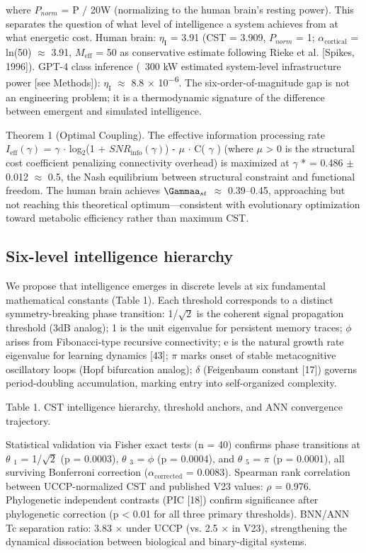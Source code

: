 \documentclass[a4paper,12pt]{article}
\providecommand{\textsubscript}[1]{\ensuremath{_{\text{#1}}}}
\begin{document}
where $P_{norm}$ = P / 20W (normalizing to the human brain's resting power).
This separates the question of what level of intelligence a system achieves from at what energetic cost.
Human brain: $\eta_{\text{I}}$ = 3.91 (CST = 3.909, $P_{norm}$ = 1; $\alpha_{\text{cortical}}$ = ln(50)  $\approx$  3.91, $M_{\text{eff}}$ = 50 as conservative estimate following Rieke et al. [Spikes, 1996]).
GPT-4 class inference (~300 kW estimated system-level infrastructure power [see Methods]): $\eta_{\text{I}}$  $\approx$  8.8 $\times$ 10\textsuperscript{$-$}\textsuperscript{6}.
The six-order-of-magnitude gap is not an engineering problem; it is a thermodynamic signature of the difference between emergent and simulated intelligence.

Theorem 1 (Optimal Coupling).
The effective information processing rate $I_{\text{eff}}(\gamma)$ =  $\gamma$   $\cdot$  log\textsubscript{2}(1 + $SNR_{\text{info}}(\gamma)$) -  $\mu$   $\cdot$  C( $\gamma$ ) (where  $\mu$  > 0 is the structural cost coefficient penalizing connectivity overhead) is maximized at  $\gamma$ * = 0.486  $\pm$  0.012  $\approx$  0.5, the Nash equilibrium between structural constraint and functional freedom.
The human brain achieves $\Gammaa_{st}$  $\approx$  0.39--0.45, approaching but not reaching this theoretical optimum---consistent with evolutionary optimization toward metabolic efficiency rather than maximum CST.

\subsection{Six-level intelligence hierarchy}

We propose that intelligence emerges in discrete levels at six fundamental mathematical constants (Table 1).
Each threshold corresponds to a distinct symmetry-breaking phase transition: 1/$\sqrt{2}$ is the coherent signal propagation threshold (3dB analog); 1 is the unit eigenvalue for persistent memory traces;  $\phi$  arises from Fibonacci-type recursive connectivity; e is the natural growth rate eigenvalue for learning dynamics [43];  $\pi$  marks onset of stable metacognitive oscillatory loops (Hopf
bifurcation analog);  $\delta$  (Feigenbaum constant [17]) governs period-doubling accumulation, marking entry into self-organized complexity.

Table 1. CST intelligence hierarchy, threshold anchors, and ANN convergence trajectory.

Statistical validation via Fisher exact tests (n = 40) confirms phase transitions at  $\theta$ \textsubscript{1} = 1/$\sqrt{2}$ (p = 0.0003),  $\theta$ \textsubscript{3} =  $\phi$  (p = 0.0004), and  $\theta$ \textsubscript{5} =  $\pi$  (p = 0.0001), all surviving Bonferroni correction ($\alpha_{\text{corrected}}$ = 0.0083).
Spearman rank correlation between UCCP-normalized CST and published V23 values:  $\rho$  = 0.976.
Phylogenetic independent contrasts (PIC [18]) confirm significance after phylogenetic correction (p < 0.01 for all three primary thresholds).
BNN/ANN Tc separation ratio: 3.83 $\times$  under UCCP (vs. 2.5 $\times$  in V23), strengthening the dynamical dissociation between biological and binary-digital systems.
\end{document}
